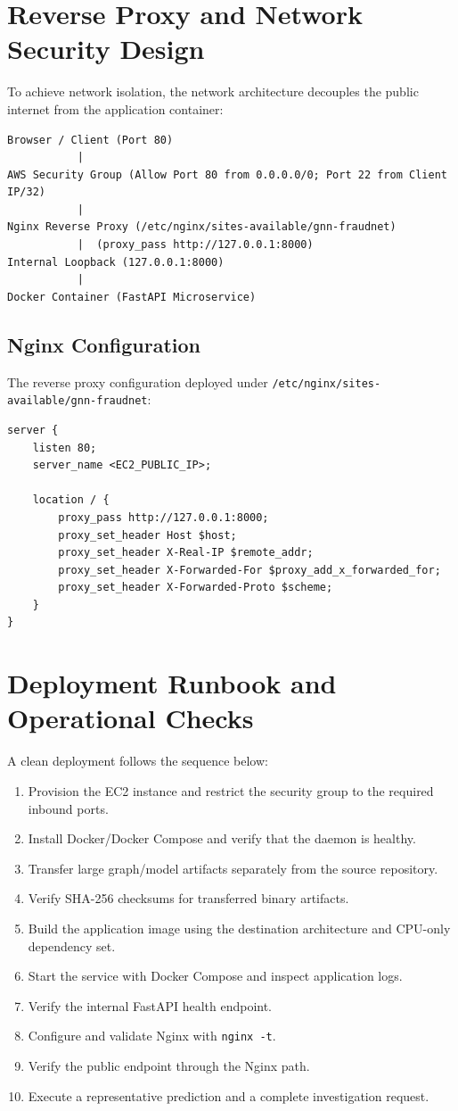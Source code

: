 \documentclass[11pt,a4paper]{report}
\begin{document}
\section{Reverse Proxy and Network Security Design}
To achieve network isolation, the network architecture decouples the public internet from the application container:
\begin{lstlisting}[caption=Production Network Path]
Browser / Client (Port 80)
           |
AWS Security Group (Allow Port 80 from 0.0.0.0/0; Port 22 from Client IP/32)
           |
Nginx Reverse Proxy (/etc/nginx/sites-available/gnn-fraudnet)
           |  (proxy_pass http://127.0.0.1:8000)
Internal Loopback (127.0.0.1:8000)
           |
Docker Container (FastAPI Microservice)
\end{lstlisting}

\subsection{Nginx Configuration}
The reverse proxy configuration deployed under \texttt{/etc/nginx/sites-available/gnn-fraudnet}:
\begin{lstlisting}
server {
    listen 80;
    server_name <EC2_PUBLIC_IP>;

    location / {
        proxy_pass http://127.0.0.1:8000;
        proxy_set_header Host $host;
        proxy_set_header X-Real-IP $remote_addr;
        proxy_set_header X-Forwarded-For $proxy_add_x_forwarded_for;
        proxy_set_header X-Forwarded-Proto $scheme;
    }
}
\end{lstlisting}


\section{Deployment Runbook and Operational Checks}

A clean deployment follows the sequence below:

\begin{enumerate}[leftmargin=1.5em]
  \item Provision the EC2 instance and restrict the security group to the required inbound ports.
  \item Install Docker/Docker Compose and verify that the daemon is healthy.
  \item Transfer large graph/model artifacts separately from the source repository.
  \item Verify SHA-256 checksums for transferred binary artifacts.
  \item Build the application image using the destination architecture and CPU-only dependency set.
  \item Start the service with Docker Compose and inspect application logs.
  \item Verify the internal FastAPI health endpoint.
  \item Configure and validate Nginx with \texttt{nginx -t}.
  \item Verify the public endpoint through the Nginx path.
  \item Execute a representative prediction and a complete investigation request.
\end{enumerate}
\end{document}
